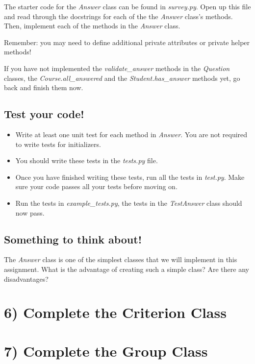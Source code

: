 \documentclass[12pt]{article}
\begin{document}
\bigskip

\noindent The starter code for the \textit{Answer} class can be found in \textit{survey.py}.
Open up this file and read through the docstrings for each of the the \textit{Answer}
class’s methods. Then, implement each of the methods in the \textit{Answer} class.

\bigskip

\noindent Remember: you may need to define additional private attributes or
private helper methods!

\bigskip

If you have not implemented the \textit{validate\_answer} methods in the \textit{Question}
classes, the \textit{Course.all\_answered} and the \textit{Student.has\_answer}
methods yet, go back and finish them now.

\bigskip

\subsection*{Test your code!}
\begin{itemize}
    \item Write at least one unit test for each method in \textit{Answer}. You are not required to write tests for initializers.
    \item You should write these tests in the \textit{tests.py} file.
    \item Once you have finished writing these tests, run all the tests in
    \textit{test.py}. Make sure your code passes all your tests before moving on.
    \item Run the tests in \textit{example\_tests.py}, the tests in the \textit{TestAnswer}
    class should now pass.
\end{itemize}

\subsection*{Something to think about!}
The \textit{Answer} class is one of the simplest classes that we will implement
in this assignment. What is the advantage of creating such a simple class? Are
there any disadvantages?

\section*{6) Complete the Criterion Class}

\section*{7) Complete the Group Class}
\end{document}
